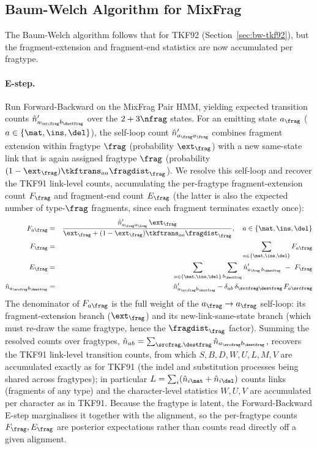 \subsection{Baum-Welch Algorithm for MixFrag}
\label{sec:bw-mixfrag}

The Baum-Welch algorithm follows that for TKF92 (Section~\ref{sec:bw-tkf92}), but
the fragment-extension and fragment-end statistics are now accumulated per
fragtype.

\paragraph{E-step.}
Run Forward-Backward on the MixFrag Pair HMM, yielding expected transition counts
$\hat{n}'_{a_\srcfrag b_\destfrag}$ over the $2+3\nfrag$ states.
For an emitting state $a_\frag$ ($a \in \{\mat,\ins,\del\}$), the self-loop count
$\hat{n}'_{a_\frag a_\frag}$ combines fragment extension within fragtype $\frag$
(probability $\ext_\frag$) with a new same-state link that is again assigned
fragtype $\frag$ (probability $(1-\ext_\frag)\tkftrans_{aa}\fragdist_\frag$).
We resolve this self-loop and recover the TKF91 link-level counts, accumulating
the per-fragtype fragment-extension count $F_\frag$ and fragment-end count
$E_\frag$ (the latter is also the expected number of type-$\frag$ fragments,
since each fragment terminates exactly once):
\begin{eqnarray*}
F_{a\frag} & = & \frac{\hat{n}'_{a_\frag a_\frag}\,\ext_\frag}
                      {\ext_\frag + (1-\ext_\frag)\tkftrans_{aa}\fragdist_\frag},
                 \quad a \in \{\mat,\ins,\del\} \\
F_\frag & = & \sum_{a \in \{\mat,\ins,\del\}} F_{a\frag} \\
E_\frag & = & \sum_{a \in \{\mat,\ins,\del\}} \sum_{b_\destfrag}
              \hat{n}'_{a_\frag\, b_\destfrag} \ -\ F_\frag \\
\hat{n}_{a_\srcfrag b_\destfrag} & = & \hat{n}'_{a_\srcfrag b_\destfrag}
              - \delta_{ab}\,\delta_{\srcfrag\destfrag}\,F_{a\srcfrag}
\end{eqnarray*}
The denominator of $F_{a\frag}$ is the full weight of the $a_\frag \to a_\frag$
self-loop: its fragment-extension branch ($\ext_\frag$) and its
new-link-same-state branch (which must re-draw the same fragtype, hence the
$\fragdist_\frag$ factor).
Summing the resolved counts over fragtypes,
$\hat{n}_{ab} = \sum_{\srcfrag,\destfrag} \hat{n}_{a_\srcfrag b_\destfrag}$,
recovers the TKF91 link-level transition counts, from which $S,B,D,W,U,L,M,V$ are
accumulated exactly as for TKF91 (the indel and substitution processes being
shared across fragtypes); in particular
$L = \sum_{i}(\hat{n}_{i\mat} + \hat{n}_{i\del})$ counts links (fragments of any
type) and the character-level statistics $W,U,V$ are accumulated per character as
in TKF91.
Because the fragtype is latent, the Forward-Backward E-step marginalises it
together with the alignment, so the per-fragtype counts $F_\frag, E_\frag$ are
posterior expectations rather than counts read directly off a given alignment.

